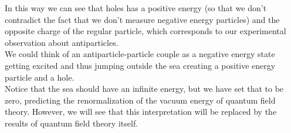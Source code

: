 In this way we can see that holes has a positive energy (so that we don't contradict the fact that we don't measure negative energy particles) and the opposite charge of the regular particle, which corresponds to our experimental observation about antiparticles.\\
We could think of an antiparticle-particle couple as a negative energy state getting excited and thus jumping outside the sea creating a positive energy particle and a hole.\\
Notice that the sea should have an infinite energy, but we have set that to be zero, predicting the renormalization of the vacuum energy of quantum field theory. However, we will see that this interpretation will be replaced by the results of quantum field theory itself.\\

